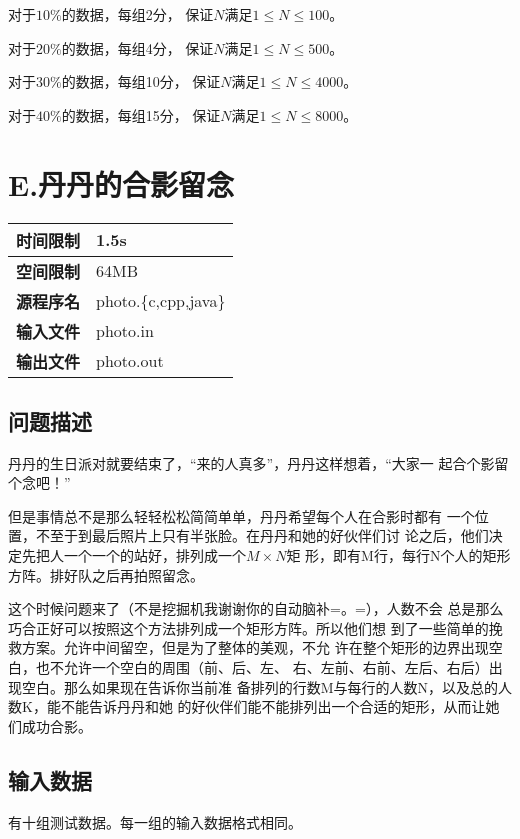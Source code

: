 \documentclass{article}
\begin{document}
对于$10\%$的数据，每组2分，
保证$N$满足$1 \leq N \leq 100$。

对于$20\%$的数据，每组4分，
保证$N$满足$1 \leq N \leq 500$。

对于$30\%$的数据，每组10分，
保证$N$满足$1 \leq N \leq 4000$。

对于$40\%$的数据，每组15分，
保证$N$满足$1 \leq N \leq 8000$。

\clearpage

\section*{E.丹丹的合影留念}
\begin{longtable}{|c|l|}
 \hline \bfseries{时间限制} & 1.5s \\
 \hline \bfseries{空间限制} & 64MB \\
 \hline \bfseries{源程序名} & photo.\{c,cpp,java\} \\
 \hline \bfseries{输入文件} & photo.in \\
 \hline \bfseries{输出文件} & photo.out \\
 \hline 
\end{longtable}

\subsection*{问题描述}
丹丹的生日派对就要结束了，“来的人真多”，丹丹这样想着，“大家一
起合个影留个念吧！”

但是事情总不是那么轻轻松松简简单单，丹丹希望每个人在合影时都有
一个位置，不至于到最后照片上只有半张脸。在丹丹和她的好伙伴们讨
论之后，他们决定先把人一个一个的站好，排列成一个$M \times N$矩
形，即有M行，每行N个人的矩形方阵。排好队之后再拍照留念。

这个时候问题来了（不是挖掘机我谢谢你的自动脑补=。=），人数不会
总是那么巧合正好可以按照这个方法排列成一个矩形方阵。所以他们想
到了一些简单的挽救方案。允许中间留空，但是为了整体的美观，不允
许在整个矩形的边界出现空白，也不允许一个空白的周围（前、后、左、
右、左前、右前、左后、右后）出现空白。那么如果现在告诉你当前准
备排列的行数M与每行的人数N，以及总的人数K，能不能告诉丹丹和她
的好伙伴们能不能排列出一个合适的矩形，从而让她们成功合影。

\subsection*{输入数据}
有十组测试数据。每一组的输入数据格式相同。
\end{document}
